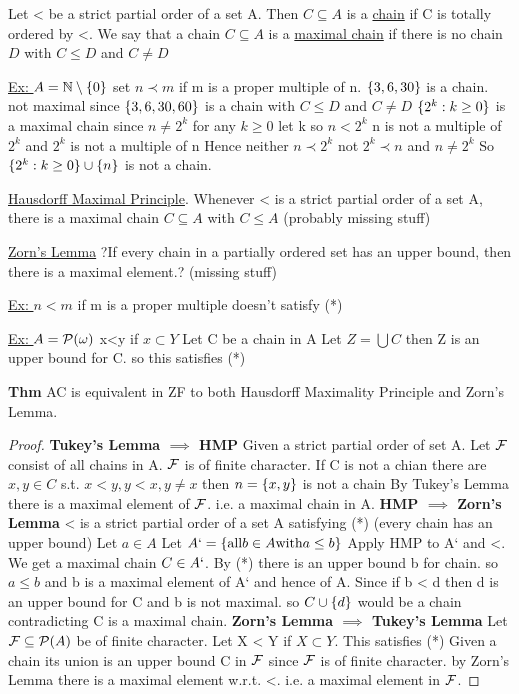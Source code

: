 \dfn Let < be a strict partial order of a set A.
Then $C \subseteq A$ is a \underline{chain} if C is totally ordered by <.
We say that a chain $C \subseteq A$ is a \underline{maximal chain} if there is no chain $D$ with $C \leq D$ and $C \neq D$

\underline{Ex: } $A = \mathbb{N} \setminus \{0\}$ set $n \prec m$ if m is a proper multiple of n.
$\{3,6,30\}$ is a chain.
not maximal since $\{3,6,30,60\}$ is a chain with $C \leq D$ and $C \neq D$
$\{2^k : k \geq 0\}$ is a maximal chain since $n \neq 2^k$ for any $k \geq 0$
let k so $n < 2^k$ n is not a multiple of $2^k$ and $2^k$ is not a multiple of n
Hence neither $n \prec 2^k$ not $2^k \prec n$ and $n \neq 2^k$
So $\{2^k : k \geq 0\} \cup \{n\}$ is not a chain.

\dfn \underline{Hausdorff Maximal Principle}.
Whenever < is a strict partial order of a set A, there is a maximal chain $C \subseteq A$ with $C \leq A$
(probably missing stuff)

\dfn \underline{Zorn's Lemma} ?If every chain in a partially ordered set has an upper bound, then there is a maximal element.?
(missing stuff)

\underline{Ex: } $n < m$ if m is a proper multiple doesn't satisfy (*)

\underline{Ex: } $A = \mathcal{P}(\omega)$ x<y if $x \subset Y$
Let C be a chain in A
Let $Z = \bigcup C$ then Z is an upper bound for C.
so this satisfies (*)

\textbf{Thm} AC is equivalent in ZF to both Hausdorff Maximality Principle and Zorn's Lemma.

\begin{proof}
    \textbf{Tukey's Lemma $\implies$ HMP}
    Given a strict partial order of set A.
    Let $\mathcal F$ consist of all chains in A.
    $\mathcal F$ is of finite character.
    If C is not a chian there are $x,y \in C$ s.t. $x < y, y < x, y \neq x$ then $n=\{x,y\}$ is not a chain
    By Tukey's Lemma there is a maximal element of $\mathcal F$.
    i.e. a maximal chain in A.
    \textbf{HMP $\implies$ Zorn's Lemma}
    < is a strict partial order of a set A satisfying (*) (every chain has an upper bound)
    Let $a \in A$
    Let $A` = \{\text{all} b \in A \text{with} a \leq b\}$
    Apply HMP to A` and <.
    We get a maximal chain $C \in A`$.
    By (*) there is an upper bound b for chain.
    so $a \leq b$ and b is a maximal element of A` and hence of A.
    Since if b < d then d is an upper bound for C and b is not maximal.
    so $C \cup \{d\}$ would be a chain contradicting C is a maximal chain.
    \textbf{Zorn's Lemma $\implies$ Tukey's Lemma}
    Let $\mathcal F \subseteq \mathcal{P}(A)$ be of finite character.
    Let X < Y if $X \subset Y$.
    This satisfies (*)
    Given a chain its union is an upper bound
    C in $\mathcal F$ since $\mathcal F$ is of finite character.
    by Zorn's Lemma there is a maximal element w.r.t. <.
    i.e. a maximal element in $\mathcal F$.
\end{proof}

